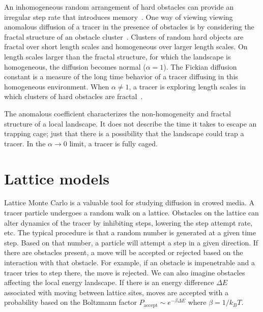 An inhomogeneous random arrangement of hard obstacles can provide an irregular
step rate that introduces memory~\cite{sokolov_fractional_02}.  One way of
viewing viewing anomalous diffusion of a tracer in the presence of obstacles is
by considering the fractal structure of an obstacle
cluster~\cite{saxton_lateral_87,saxton_anomalous_94}.  Clusters of random hard
objects are fractal over short length scales and homogeneous over larger length
scales.  On length scales larger than the fractal structure, for which the
landscape is homogeneous, the diffusion becomes normal ($\alpha=1$).  The
Fickian diffusion constant is a measure of the long time behavior of a tracer
diffusing in this homogeneous environment. When $\alpha \neq 1$, a tracer is
exploring length scales in which clusters of hard obstacles are
fractal~\cite{saxton_lateral_87}. 

The anomalous coefficient characterizes the non-homogeneity and fractal
structure of a local landscape.  It does not describe the time it takes to
escape an trapping cage; just that there is a possibility that the landscape
could trap a tracer.  In the $\alpha \rightarrow 0$ limit, a tracer is fully
caged.  

\section{Lattice models}

Lattice Monte Carlo is a valuable tool for studying diffusion in crowed media. A
tracer particle undergoes a random walk on a lattice. Obstacles on the lattice
can alter dynamics of the tracer by inhibiting steps, lowering the step attempt
rate, etc.  The typical procedure is that a random number is generated at a
given time step.  Based on that number, a particle will attempt a step in a
given direction. If there are obstacles present, a move will be accepted or
rejected based on the interaction with that obstacle. For example, if an
obstacle is impenetrable and a tracer tries to step there, the move is rejected.
We can also imagine obstacles affecting the local energy landscape. If there is
an energy difference $ \Delta E$ associated with moving between lattice sites,
moves are accepted with a probability based on the Boltzmann factor
$P_{\text{accept}} \sim e^{-\beta \Delta E } $ where $\beta =  1 / k_B T$.

